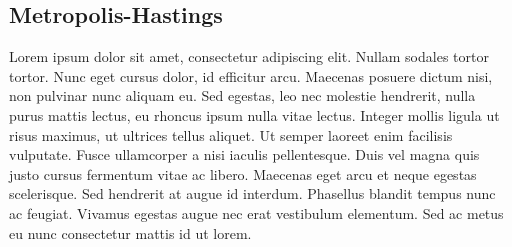 \subsection{Metropolis-Hastings}
Lorem ipsum dolor sit amet, consectetur adipiscing elit. Nullam sodales tortor tortor. Nunc eget cursus dolor, id efficitur arcu. Maecenas posuere dictum nisi, non pulvinar nunc aliquam eu. Sed egestas, leo nec molestie hendrerit, nulla purus mattis lectus, eu rhoncus ipsum nulla vitae lectus. Integer mollis ligula ut risus maximus, ut ultrices tellus aliquet. Ut semper laoreet enim facilisis vulputate. Fusce ullamcorper a nisi iaculis pellentesque. Duis vel magna quis justo cursus fermentum vitae ac libero. Maecenas eget arcu et neque egestas scelerisque. Sed hendrerit at augue id interdum. Phasellus blandit tempus nunc ac feugiat. Vivamus egestas augue nec erat vestibulum elementum. Sed ac metus eu nunc consectetur mattis id ut lorem.